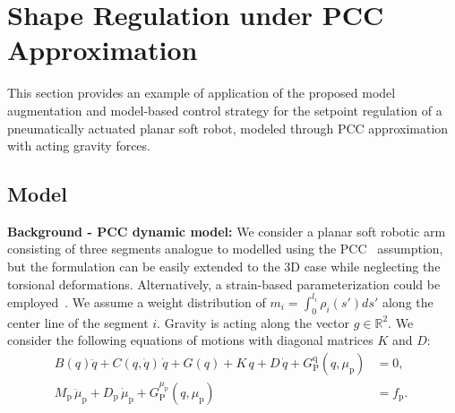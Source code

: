 \section{Shape Regulation under PCC Approximation}
%
This section provides an example of application of the proposed model augmentation and model-based control strategy for the setpoint regulation of a pneumatically actuated planar soft robot, modeled through \gls{PCC} approximation with acting gravity forces. 

\subsection{Model}\label{sub:backstepping:pcc_model}
\textbf{Background - PCC dynamic model:}
We consider a planar soft robotic arm consisting of three segments analogue to \cite{della2020model} modelled using the \gls{PCC}~\cite{jones2006kinematics} assumption, but the formulation can be easily extended to the 3D case while neglecting the torsional deformations. Alternatively, a strain-based parameterization could be employed~\cite{boyer2020dynamics}. 
We assume a weight distribution of $m_i = \int_{0}^{l_i} \rho_i(s') ds'$ along the center line of the segment $i$. Gravity is acting along the vector $g \in \mathbb{R}^2$. We consider the following equations of motions with diagonal matrices $K$ and $D$:
\begin{equation}\label{eq:backstepping:dynamics_pcc_case}
\begin{split}
	B(q)\ddot{q} + C(q,\dot{q}) \, \dot{q} + G(q) + K \, q + D \, \dot{q} + G_{\mathrm{P}}^{\mathrm{q}}(q,\mu_\mathrm{p}) &= 0, \\
	M_\mathrm{p} \, \ddot{\mu}_\mathrm{p} + D_\mathrm{p} \, \dot{\mu}_\mathrm{p} + G_{\mathrm{P}}^{\mu_\mathrm{p}}(q,\mu_\mathrm{p}) &= f_\mathrm{p}. \; 
\end{split}
\end{equation}


